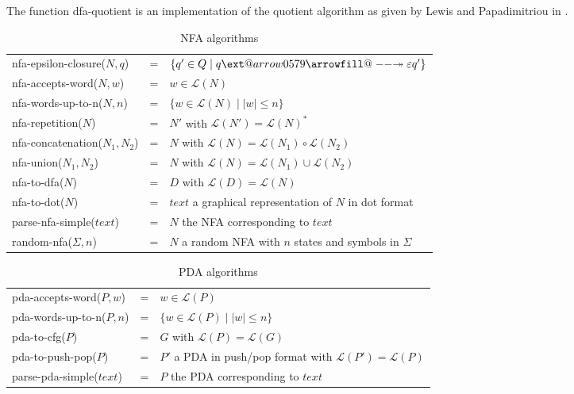 \documentclass[11pt]{article}
\makeatletter
\newcommand*{\Language}[1]{\ensuremath{\mathcal{L}(#1)}}
\providecommand*{\twoheadrightarrowfill@}{%
  \arrowfill@\relbar\relbar\twoheadrightarrow
}
\providecommand*{\xtwoheadrightarrow}[2][]{%
  \ext@arrow 0579\twoheadrightarrowfill@{#1}{#2}%
}
\makeatother
\begin{document}
The function \textsf{dfa-quotient} is an implementation of the quotient algorithm as given by Lewis and Papadimitriou in \cite{DBLP:books/daglib/0096996}.

\begin{table}[h!]
\begin{tabular}{ |lll| } 
\hline
\textsf{nfa-epsilon-closure}($N, q$) & = & $\{ q' \in Q \mid q \xtwoheadrightarrow{\varepsilon} q' \}$ \\
\textsf{nfa-accepts-word}($N,w$) & = & $w \in \Language{N}$ \\
\textsf{nfa-words-up-to-n}($N,n$) & = & $\{ w \in \Language{N} \mid |w| \leq n \}$ \\
\textsf{nfa-repetition}($N$) & = & $N'$ with $\Language{N'} = \Language{N}^*$ \\
\textsf{nfa-concatenation}($N_1, N_2$) & = & $N$ with $\Language{N} = \Language{N_1} \circ \Language{N_2}$ \\
\textsf{nfa-union}($N_1, N_2$) & = & $N$ with $\Language{N} = \Language{N_1} \cup \Language{N_2}$ \\
\textsf{nfa-to-dfa}($N$) & = & $D$ with $\Language{D} = \Language{N}$ \\
\textsf{nfa-to-dot}($N$) & = & $text$ a graphical representation of $N$ in dot format \\
\textsf{parse-nfa-simple}($text$) & = & $N$ the NFA corresponding to $text$ \\
\textsf{random-nfa}($\Sigma, n$) & = & $N$ a random NFA with $n$ states and symbols in $\Sigma$ \\
\hline
\end{tabular}
\caption{NFA algorithms}
\label{table:nfa-algorithms}
\end{table}

\begin{table}[h!]
\begin{tabular}{ |lll| } 
\hline
\textsf{pda-accepts-word}($P,w$) & = & $w \in \Language{P}$ \\
\textsf{pda-words-up-to-n}($P,n$) & = & $\{ w \in \Language{P} \mid |w| \leq n \}$ \\
\textsf{pda-to-cfg}($P$) & = & $G$ with $\Language{P} = \Language{G}$ \\
\textsf{pda-to-push-pop}($P$) & = & $P'$ a PDA in push/pop format with $\Language{P'} = \Language{P}$ \\
\textsf{parse-pda-simple}($text$) & = & $P$ the PDA corresponding to $text$ \\
\hline
\end{tabular}
\caption{PDA algorithms}
\label{table:pda-algorithms}
\end{table}
\end{document}
